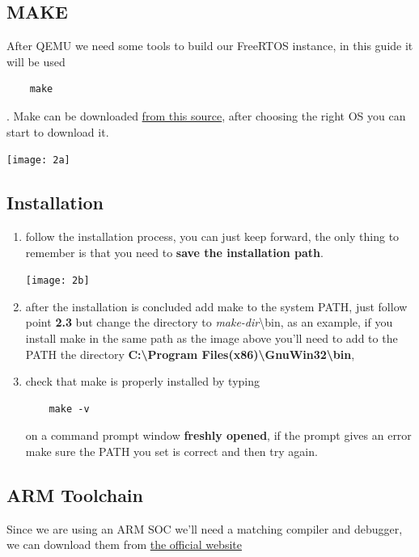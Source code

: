 \documentclass{exam}
\begin{document}
\subsection{MAKE}

After QEMU we need some tools to build our FreeRTOS instance, in this guide it will be used 
\begin{lstlisting}
    make
\end{lstlisting}.
Make can be downloaded \href{https://gnuwin32.sourceforge.net/packages/make.htms}{from this source}, after choosing the right OS you can start to download it.

\texttt{[image: 2a]}

\subsection{Installation} 
    \begin{enumerate}
        \item follow the installation process, you can just keep forward, the only thing to remember is that you need to \textbf{save the installation path}.

        \texttt{[image: 2b]}

        \item after the installation is concluded add make to the system PATH, just follow point \textbf{2.3} but change the directory to \textit{make-dir}\textbackslash bin, as an example, if you install make in the same path as the image above you'll need to add to the PATH the directory \textbf{C:\textbackslash Program Files(x86)\textbackslash GnuWin32\textbackslash bin},

        \item check that make is properly installed by typing 
\begin{lstlisting}
    make -v 
\end{lstlisting} 
        on a command prompt window \textbf{freshly opened}, if the prompt gives an error make sure the PATH you set is correct and then try again.
        
    \end{enumerate}

\subsection{ARM Toolchain}

Since we are using an ARM SOC we'll need a matching compiler and debugger, we can download them from \href{https://developer.arm.com/downloads/-/arm-gnu-toolchain-downloads}{the official website}
\end{document}
